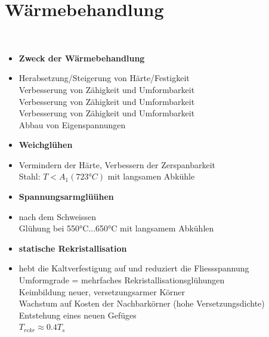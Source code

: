 \documentclass[8.5pt,twocolumn]{extarticle}
\begin{document}
    \section{Wärmebehandlung}\mbox{}\\
    \begin{minipage}[t]{1\columnwidth}
        \begin{itemize}[label={}, leftmargin=*,  itemsep=0.01em]
            \item \textbf{Zweck der Wärmebehandlung} 
            \item Herabsetzung/Steigerung von Härte/Festigkeit \\ Verbesserung von Zähigkeit und Umformbarkeit \\ Verbesserung von Zähigkeit und Umformbarkeit \\ Verbesserung von Zähigkeit und Umformbarkeit \\ Abbau von Eigenspannungen
        \end{itemize} 
    \end{minipage}\hfill
    \begin{minipage}[t]{0.5\columnwidth}
        \begin{itemize}[label={}, leftmargin=*,  itemsep=0.01em]
            \item \textbf{Weichglühen} 
            \item Vermindern der Härte, Verbessern der Zerspanbarkeit \\ Stahl: $T < A_1 (723°C)$ mit langsamen Abkühle
        \end{itemize} 
    \end{minipage}\hfill
    \begin{minipage}[t]{0.5\columnwidth}
        \begin{itemize}[label={}, leftmargin=*,  itemsep=0.01em]
            \item \textbf{Spannungsarmglüühen} 
            \item nach dem Schweissen \\ Glühung bei 550°C...650°C mit langsamem Abkühlen \\ 
        \end{itemize} 
    \end{minipage}\hfill
    \begin{minipage}[t]{1\columnwidth}
        \begin{itemize}[label={}, leftmargin=*,  itemsep=0.01em]
            \item \textbf{statische Rekristallisation} 
            \item hebt die Kaltverfestigung auf und reduziert die Fliessspannung \\ Umformgrade = mehrfaches Rekristallisationsglühungen \\ Keimbildung neuer, versetzungsarmer Körner \\ Wachstum auf Kosten der Nachbarkörner (hohe Versetzungsdichte) \\ Entstehung eines neuen Gefüges \\ $T_{rekr} \approx 0.4T_s$
        \end{itemize}
    \end{minipage}
\end{document}
